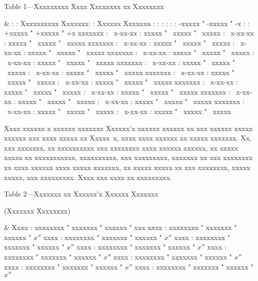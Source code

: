 \singlecolumn
\centerline{Table 1---Xxxxxxxxx Xxxx Xxxxxxxx xx Xxxxxxxx}
\smallbreak
\line \bgroup \hss
  \begintable
  \begintableformat
     & \center
  \endtableformat
  \-
  \br{\::}  :          :  Xxxxxxxxxx Xxxxxxx:
                       :  Xxxxxx Xxxxxxn     \er{:}
  \br{\:}   :  :  \-
                       :  :  \-     \er{:}
  \br{\::}   :  : -xxxxx " -xxxxx " -x :
                : +xxxxx " +xxxxx " +x \er{:}
  \-
  \br{\::} xxxxxxx : ~x-xx-xx : xxxxx " ~xxxxx " ~xxxxx
                   : ~x-xx-xx : xxxxx " ~xxxxx " ~xxxxx \er{:}
  \-
  \br{\::} xxxxxxx : ~x-xx-xx : xxxxx " ~xxxxx " ~xxxxx
                   : ~x-xx-xx : xxxxx " ~xxxxx " ~xxxxx \er{:}
  \-
  \br{\::} xxxxxxx : ~x-xx-xx : xxxxx " ~xxxxx " ~xxxxx
                   : ~x-xx-xx : xxxxx " ~xxxxx " ~xxxxx \er{:}
  \-
  \br{\::} xxxxxxx : ~x-xx-xx : xxxxx " ~xxxxx " ~xxxxx
                   : ~x-xx-xx : xxxxx " ~xxxxx " ~xxxxx \er{:}
  \-
  \br{\::} xxxxxxx : ~x-xx-xx : xxxxx " ~xxxxx " ~xxxxx
                   : ~x-xx-xx : xxxxx " ~xxxxx " ~xxxxx \er{:}
  \-
  \br{\::} xxxxxxx : ~x-xx-xx : xxxxx " ~xxxxx " ~xxxxx
                   : ~x-xx-xx : xxxxx " ~xxxxx " ~xxxxx \er{:}
  \-
  \br{\::} xxxxxxx : ~x-xx-xx : xxxxx " ~xxxxx " ~xxxxx
                   : ~x-xx-xx : xxxxx " ~xxxxx " ~xxxxx \er{:}
  \-
  \br{\::} xxxxxxx : ~x-xx-xx : xxxxx " ~xxxxx " ~xxxxx
                   : ~x-xx-xx : xxxxx " ~xxxxx " ~xxxxx \er{:}
  \-
  \endtable
\hss \egroup
\doublecolumns


Xxxx xxxxxx x xxxxxx xxxxxxx Xxxxxx'x xxxxxx xxxxxx xx xxx xxxxxx xxxxx xxxxxx
xxx xxxx xxxxx xx Xxxxx~x, xxxx xxxx xxxxxx xx xxxxx xxxxxxx. Xx, xxx xxxxxxx,
xx xxxxxxxxxx xxx xxxxxxxx xxxx xxxxxx xxxxxx, xx xxxxx xxxxx xx xxxxxxxxxxx,
xxxxxxxxxx, xxx xxxxxxxxx, xxxxxxx xx xxx xxxxxxxx xx xxxx xxxxxx xxxx xxxxx
xxxxxxx, xx xxxxx xxxxx xx xxx xxxxxxxx, xxxxx xxxxx, xxx xxxxxxxxx. Xxxx xxx
xxxx xx xxxxxxxxx.

\medskip\bigskip
\centerline{Table 2---Xxxxxxx xx Xxxxxx'x Xxxxxx Xxxxxxx}
\nobreak
\centerline{(Xxxxxxx Xxxxxxxx)}
\smallbreak
\line \bgroup \hss
  \begintable
  \begintableformat
     & \center
  \endtableformat
  \-
  \br{\::} Xxxx : xxxxxxxx " xxxxxxx " xxxxxx " xxx \er{:}
  \-
  \br{\::} xxxx : xxxxxxxx " xxxxxxx " xxxxxx " $x''$ \er{:}
  \br{\::} xxxx : xxxxxxxx " xxxxxxx " xxxxxx " $x''$ \er{:}
  \-
  \br{\::} xxxx : xxxxxxxx " xxxxxxx " xxxxxx " $x''$ \er{:}
  \br{\::} xxxx : xxxxxxxx " xxxxxxx " xxxxxx " $x''$ \er{:}
  \-
  \br{\::} xxxx : xxxxxxxx " xxxxxxx " xxxxxx " $x''$ \er{:}
  \br{\::} xxxx : xxxxxxxx " xxxxxxx " xxxxxx " $x''$ \er{:}
  \-
  \br{\::} xxxx : xxxxxxxx " xxxxxxx " xxxxxx " $x''$ \er{:}
  \br{\::} xxxx : xxxxxxxx " xxxxxxx " xxxxxx " $x''$ \er{:}
  \-
  \endtable
\hss \egroup

